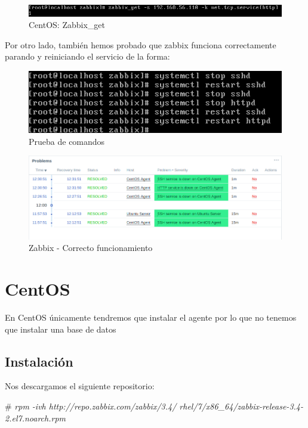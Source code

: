 \begin{figure}[h]
	\centering
	\includegraphics[scale=0.5]{images/final2.png}
	\caption{CentOS: Zabbix\_get}
\end{figure}

\newpage
Por otro lado, también hemos probado que zabbix funciona correctamente parando y reiniciando el servicio de la forma:

\begin{figure}[h]
	\centering
	\includegraphics[scale=0.5]{images/bateria.png}
	\caption{Prueba de comandos}
\end{figure}

\begin{figure}[h]
	\centering
	\includegraphics[scale=0.5]{images/final3.png}
	\caption{Zabbix - Correcto funcionamiento}
\end{figure}



\newpage
\section{CentOS}

En CentOS únicamente tendremos que instalar el agente por lo que no tenemos que instalar una base de datos

\subsection{Instalación}

Nos descargamos el siguiente repositorio:

\# \textit{rpm -ivh http://repo.zabbix.com/zabbix/3.4/
	rhel/7/x86\_64/zabbix-release-3.4-2.el7.noarch.rpm} \\


